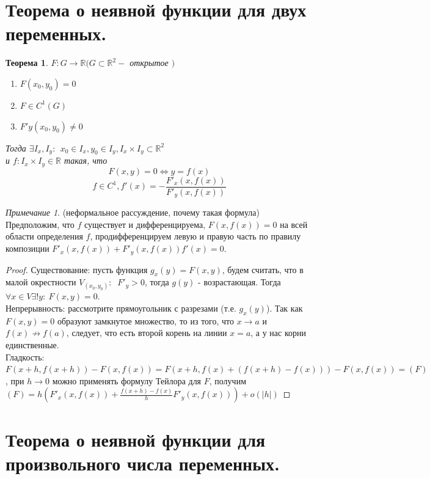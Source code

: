 \documentclass{article}
\theoremstyle{indented}
\newtheorem{theorem}{Теорема}
\theoremstyle{definition}
\theoremstyle{remark}
\newtheorem{remark}{Примечание}
\begin{document}
\section{Теорема о неявной функции для двух переменных.}


\begin{theorem}
    $F: G\to \mathbb{R} (G\subset \mathbb{R}^2 - $ открытое $)$
    \begin{enumerate}
        \item $F(x_0, y_0) = 0$
        \item $F \in C^1(G)$
        \item $F'y(x_0, y_0) \not= 0$
    \end{enumerate} 
    Тогда $\exists I_x, I_y: \ \ x_0\in I_x, y_0 \in I_y, I_x\times I_y \subset \mathbb{R}^2$\\
    и $f: I_x\times I_y \in \mathbb{R}$ такая, что 
    $$F(x,y)=0 \Leftrightarrow y=f(x)$$
    $$f\in C^1, f'(x)=-\frac{F'_x(x,f(x))}{F'_y(x,f(x))}$$
\end{theorem}

\begin{remark}
    (неформальное рассуждение, почему такая формула) Предположим, что $f$ существует и дифференцируема,
    $F(x,f(x))=0$ на всей области определения $f$, продифференцируем левую и правую часть по правилу композиции
    $F'_x(x,f(x))+F'_y(x,f(x)) f'(x)=0$.
\end{remark}

\begin{proof}
    Существование: пусть функция $g_x(y) = F(x,y)$, будем считать, что в малой окрестности $V_{(x_0,y_0)}: \ $ 
    $F'_y > 0$, тогда $g(y)$ - возрастающая. Тогда $\forall x \in V \exists ! y: \ F(x,y)=0$. \\
    Непрерывность: рассмотрите прямоугольник с разрезами (т.е. $g_x(y)$). Так как $F(x,y)=0$ образуют
    замкнутое множество, то из того, что $x \to a$ и $f(x) \not\to f(a)$, следует, что есть второй корень на линии $x=a$, а у 
    нас корни единственные. \\
    Гладкость: $F(x+h,f(x+h))-F(x,f(x))=F(x+h,f(x)+(f(x+h)-f(x)))-F(x,f(x))=(F)$, при $h\to 0$ можно применять формулу Тейлора 
    для $F$, получим $(F)=h(F'_x(x,f(x))+\frac{f(x+h)-f(x)}{h}F'_y(x,f(x)))+o(|h|)$
\end{proof}

\section{Теорема о неявной функции для произвольного числа переменных.}
\end{document}
